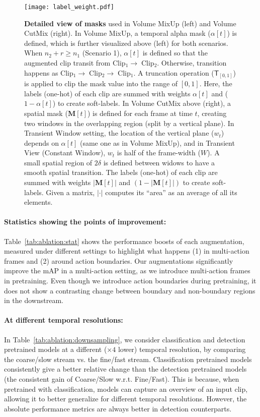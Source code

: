 \documentclass[letterpaper]{article} \usepackage{aaai23}  \usepackage{times}  \usepackage{helvet}  \usepackage{courier}  \usepackage[hyphens]{url}  \usepackage{graphicx} \urlstyle{rm} \def\UrlFont{\rm}  \usepackage{natbib}  \usepackage{caption} \frenchspacing  \setlength{\pdfpagewidth}{8.5in}  \setlength{\pdfpageheight}{11in}  \usepackage{algorithm}
\newcommand{\tref}[1]{Table~\ref{#1}}
\begin{document}
\begin{figure*}[]
	\centering
	\texttt{[image: label\_weight.pdf]}
	\caption{\textbf{Detailed view of masks} used in Volume MixUp (left) and Volume CutMix (right). In Volume MixUp, a temporal alpha mask ($\alpha[t]$) is defined, which is further visualized above (left) for both scenarios. When $n_2+r\geq n_1$ (Scenario 1), $\alpha[t]$ is defined so that the augmented clip transit from Clip$_1\rightarrow\;$Clip$_2$. Otherwise, transition happens as Clip$_1\rightarrow\;$Clip$_2\rightarrow\;$Clip$_1$. A truncation operation ($\mathsf{T}_{[0,1]}$) is applied to clip the mask value into the range of $[0,1]$. Here, the labels (one-hot) of each clip are summed with weights $\alpha[t]$ and ($1-\alpha[t]$) to create soft-labels. In Volume CutMix above (right), a spatial mask ($\mathbf{M}[t]$) is defined for each frame at time $t$, creating two windows in the overlapping region (split by a vertical plane). In Transient Window setting, the location of the vertical plane ($w_t$) depends on $\alpha[t]$ (same one as in Volume MixUp), and in Transient View (Constant Window), $w_t$ is half of the frame-width ($W$). A small spatial region of $2\delta$ is defined between widows to have a smooth spatial transition. 
The labels (one-hot) of each clip are summed with weights $|\mathbf{M}[t]|$ and $(1-|\mathbf{M}[t]|)$ to create soft-labels.  Given a matrix, $|\cdot|$ computes its ``area'' as an average of all its elements. }
	\vspace{-3mm}
	\label{fig:app}
\end{figure*}

\paragraph{Statistics showing the points of improvement:} \tref{tab:ablation:stat} shows the performance boosts of each augmentation, measured under different settings to highlight what happens (1) in multi-action frames and (2) around action boundaries. Our augmentations significantly improve the mAP in a multi-action setting, as we introduce multi-action frames in pretraining. Even though we introduce action boundaries during pretraining, it does not show a contrasting change between boundary and non-boundary regions in the downstream.

\paragraph{At different temporal resolutions:} In \tref{tab:ablation:downsampling}, we consider classification and detection pretrained models at a different ($\times 4$ lower) temporal resolution, by comparing the coarse/slow stream vs. the fine/fast stream. Classification pretrained models consistently give a better relative change than the detection pretrained models (the consistent gain of Coarse/Slow w.r.t. Fine/Fast). This is because, when pretrained with classification, models can capture an overview of an input clip, allowing it to better generalize for different temporal resolutions. However, the absolute performance metrics are always better in detection counterparts.
\end{document}
